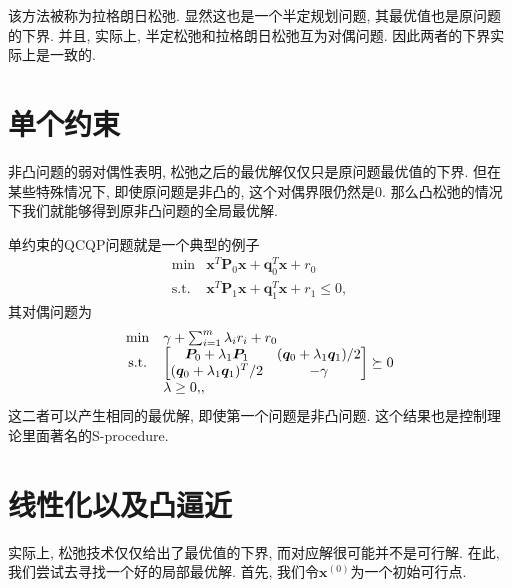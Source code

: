 \documentclass{article}
\begin{document}
该方法被称为拉格朗日松弛.
显然这也是一个半定规划问题, 其最优值也是原问题的下界.
并且, 实际上, 半定松弛和拉格朗日松弛互为对偶问题.
因此两者的下界实际上是一致的.



\section{单个约束}
非凸问题的弱对偶性表明, 松弛之后的最优解仅仅只是原问题最优值的下界. 
但在某些特殊情况下, 即使原问题是非凸的, 这个对偶界限仍然是$0$. 
那么凸松弛的情况下我们就能够得到原非凸问题的全局最优解.

单约束的QCQP问题就是一个典型的例子
\begin{equation} 
\begin{array}{cl}
{\min}  & {\bm{x}^T \bm{P}_0 \bm{x} + \bm{q}_0^T \bm{x} + r_0} \\
{\text{s.t.}} & {\bm{x}^T \bm{P}_1 \bm{x} + \bm{q}_1^T \bm{x} + r_1 \leq 0},
\end{array}
\end{equation}
其对偶问题为
\begin{equation}
\begin{array} { c l } 
{\min} & { \gamma + \sum_{i=1}^{m} \lambda_{i} r_{i} + r_{0} } \\ 
{\text {s.t.}} & 
{\begin{bmatrix} 
{\bm{P}_0 + \lambda_1 \bm{P}_1} & {(\bm{q}_0 + \lambda_1 \bm{q}_1)/2} \\
{(\bm{q}_0 +  \lambda_1 \bm{q}_1)^T/2} & {-\gamma}
\end{bmatrix} \succeq 0} \\ 
{} & {\lambda \ge 0,}, 
\end{array}
\end{equation}
这二者可以产生相同的最优解, 即使第一个问题是非凸问题.
这个结果也是控制理论里面著名的S-procedure.



\section{线性化以及凸逼近}
实际上, 松弛技术仅仅给出了最优值的下界, 而对应解很可能并不是可行解.
在此, 我们尝试去寻找一个好的局部最优解.
首先, 我们令$\bm{x}^{(0)}$为一个初始可行点.
\end{document}
